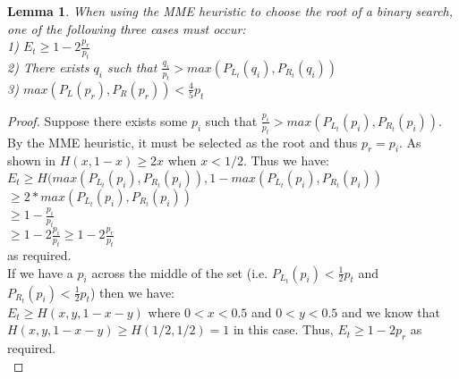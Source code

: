 \documentclass[letterpaper,12pt,titlepage,oneside,final]{book}
\theoremstyle{plain}
\newtheorem{lem}[thm]{Lemma}
\begin{document}
\begin{lem}
When using the MME heuristic to choose the root of a binary search, one of the following three cases must occur: \\
1) $E_t \geq 1-2 \frac{p_r}{p_t}$ \\
2) There exists $q_i$ such that $\frac{q_i}{p_t} > max(P_{L_t}(q_i), P_{R_t}(q_i))$\\
3)  $max(P_L(p_r), P_R(p_r)) < \frac{4}{5} p_t$\\
\end{lem}
\begin{proof}
Suppose there exists some $p_i$ such that $\frac{p_i}{p_t} > max(P_{L_t}(p_i), P_{R_t}(p_i))$. By the MME heuristic, it must be selected as the root and thus $p_r=p_i$. As shown in \cite{gallager1968information} $H(x,1-x) \geq 2x$ when $x<1/2$. Thus we have: \\
$E_t \geq H( max(P_{L_t}(p_i), P_{R_t}(p_i)), 1-max(P_{L_t}(p_i), P_{R_t}(p_i))$ \\
$ \geq 2*max(P_{L_t}(p_i), P_{R_t}(p_i))$ \\ $ \geq 1-\frac{p_i}{p_t}$ \\ 
$ \geq 1-2 \frac{p_i}{p_t} \geq 1-2 \frac{p_r}{p_t}$ \\
 as required. \\
 
 If we have a $p_i$ across the middle of the set (i.e. $P_{L_t}(p_i) < \frac{1}{2}p_t$ and $P_{R_t}(p_i) < \frac{1}{2}p_t$) then we have: \\
 $E_t \geq H(x, y, 1-x-y)$ where $0 < x < 0.5$ and $0 < y < 0.5$  and we know that \\
 $H(x, y, 1-x-y) \geq H(1/2, 1/2) = 1$ in this case.
 Thus, $E_t \geq 1-2p_r$ as required. \\
 

\end{proof}
\end{document}
